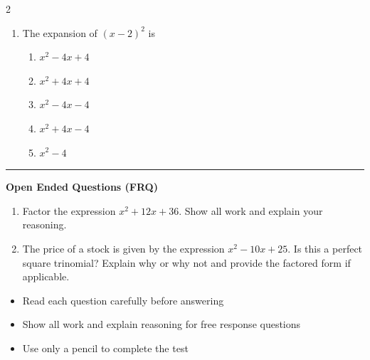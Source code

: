 \documentclass[10pt]{article}
\begin{document}
\begin{multicols}{2}
\begin{enumerate}[label=\textbf{Q\arabic*.}, leftmargin=*, itemsep=6pt, parsep=0pt]
  \item \small The expansion of $(x - 2)^2$ is
  \begin{enumerate}[label=(\Alph*), leftmargin=0.6cm, nosep, itemsep=2pt]
    \item $x^2 - 4x + 4$
    \item $x^2 + 4x + 4$
    \item $x^2 - 4x - 4$
    \item $x^2 + 4x - 4$
    \item $x^2 - 4$
  \end{enumerate}

\end{enumerate}
\end{multicols}

\vspace{-0.2cm}
\hrule
\vspace{0.2cm}
\textbf{\small Open Ended Questions (FRQ)}
\begin{enumerate}[label=\textbf{Q\arabic*.}, start=9, itemsep=5pt, topsep=0pt]

  \item \small Factor the expression $x^2 + 12x + 36$. Show all work and explain your reasoning. \vspace{2cm}

  \item \small The price of a stock is given by the expression $x^2 - 10x + 25$. Is this a perfect square trinomial? Explain why or why not and provide the factored form if applicable. \vspace{2cm}

\end{enumerate}

\vfill

\begin{tcolorbox}[colback=blue!5, colframe=mainblue!50, title=\small \textbf{Chef's Tips}, fonttitle=\bfseries, bottom=1mm]
\begin{itemize}[noitemsep, topsep=2pt, leftmargin=0.5cm]
  \item \scriptsize Read each question carefully before answering\item \scriptsize Show all work and explain reasoning for free response questions\item \scriptsize Use only a pencil to complete the test
\end{itemize}
\end{tcolorbox}
\end{document}
